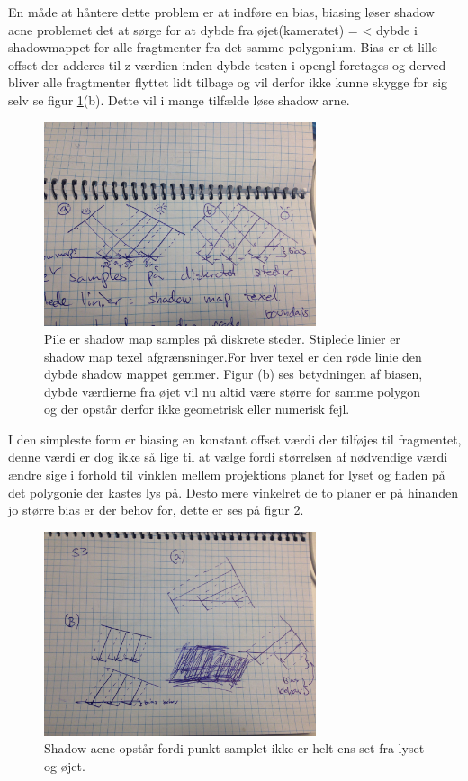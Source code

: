 \documentclass[11pt,a4paper]{article}
\begin{document}
En måde at håntere dette problem er at indføre en bias, biasing løser shadow acne problemet det at sørge for at dybde fra øjet(kameratet) = < dybde i shadowmappet for alle fragtmenter fra det samme polygonium.  Bias er et lille offset der adderes til z-værdien inden dybde testen i opengl foretages og derved bliver alle fragtmenter flyttet lidt tilbage og vil derfor ikke kunne skygge for sig selv se figur \ref{S2}(b). Dette vil i mange tilfælde løse shadow arne.

\begin{figure}[ht!]
\centering
\includegraphics[width=80mm]{img/S2.jpg}
\caption{Pile er shadow map samples på diskrete steder. Stiplede linier er shadow map texel afgrænsninger.For hver texel er den røde linie den dybde shadow mappet gemmer. Figur (b) ses betydningen af biasen, dybde værdierne fra øjet vil nu altid være større for samme polygon og der opstår derfor ikke geometrisk eller numerisk fejl.}
\label{S2}
\end{figure}

I den simpleste form er biasing en konstant offset værdi der tilføjes til fragmentet, denne værdi er dog ikke så lige til at vælge fordi størrelsen af nødvendige værdi ændre sige i forhold til vinklen mellem projektions planet for lyset og fladen på det polygonie der kastes lys på. Desto mere vinkelret de to planer er på hinanden jo større bias er der behov for, dette er ses på figur \ref{S3}.

\begin{figure}[ht!]
\centering
\includegraphics[width=80mm]{img/S3.jpg}
\caption{Shadow acne opstår fordi punkt samplet ikke er helt ens set fra lyset og øjet.}
\label{S3}
\end{figure}
\end{document}
